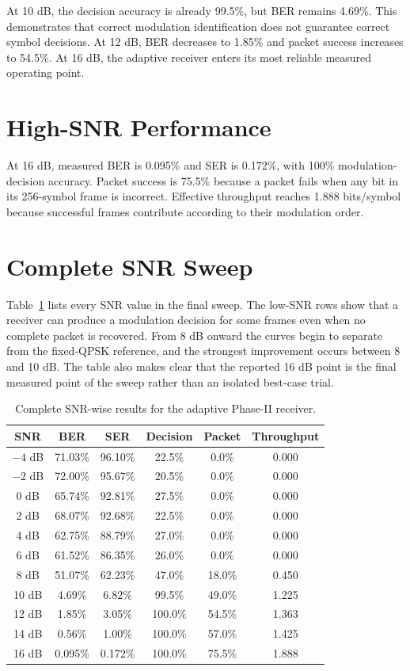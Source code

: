 \documentclass[12pt,twoside,openright]{report}
\begin{document}
At 10 dB, the decision accuracy is already 99.5\%, but BER remains 4.69\%.
This demonstrates that correct modulation identification does not guarantee
correct symbol decisions. At 12 dB, BER decreases to 1.85\% and packet
success increases to 54.5\%. At 16 dB, the adaptive receiver enters its
most reliable measured operating point.

\section{High-SNR Performance}
At 16 dB, measured BER is 0.095\% and SER is 0.172\%, with 100\%
modulation-decision accuracy. Packet success is 75.5\% because a packet
fails when any bit in its 256-symbol frame is incorrect. Effective
throughput reaches 1.888 bits/symbol because successful frames contribute
according to their modulation order.

\section{Complete SNR Sweep}
Table~\ref{tab:fullsnrresults} lists every SNR value in the final sweep.
The low-SNR rows show that a receiver can produce a modulation decision for
some frames even when no complete packet is recovered. From 8 dB onward the
curves begin to separate from the fixed-QPSK reference, and the strongest
improvement occurs between 8 and 10 dB. The table also makes clear that the
reported 16 dB point is the final measured point of the sweep rather than an
isolated best-case trial.

\begin{table}[htbp]
\centering
\small
\caption{Complete SNR-wise results for the adaptive Phase-II receiver.}
\label{tab:fullsnrresults}
\begin{tabular}{c c c c c c}
\toprule
\textbf{SNR} & \textbf{BER} & \textbf{SER} & \textbf{Decision} &
\textbf{Packet} & \textbf{Throughput}\\
\midrule
$-4$ dB & 71.03\% & 96.10\% & 22.5\% & 0.0\% & 0.000\\
$-2$ dB & 72.00\% & 95.67\% & 20.5\% & 0.0\% & 0.000\\
0 dB & 65.74\% & 92.81\% & 27.5\% & 0.0\% & 0.000\\
2 dB & 68.07\% & 92.68\% & 22.5\% & 0.0\% & 0.000\\
4 dB & 62.75\% & 88.79\% & 27.0\% & 0.0\% & 0.000\\
6 dB & 61.52\% & 86.35\% & 26.0\% & 0.0\% & 0.000\\
8 dB & 51.07\% & 62.23\% & 47.0\% & 18.0\% & 0.450\\
10 dB & 4.69\% & 6.82\% & 99.5\% & 49.0\% & 1.225\\
12 dB & 1.85\% & 3.05\% & 100.0\% & 54.5\% & 1.363\\
14 dB & 0.56\% & 1.00\% & 100.0\% & 57.0\% & 1.425\\
16 dB & 0.095\% & 0.172\% & 100.0\% & 75.5\% & 1.888\\
\bottomrule
\end{tabular}
\end{table}
\end{document}
